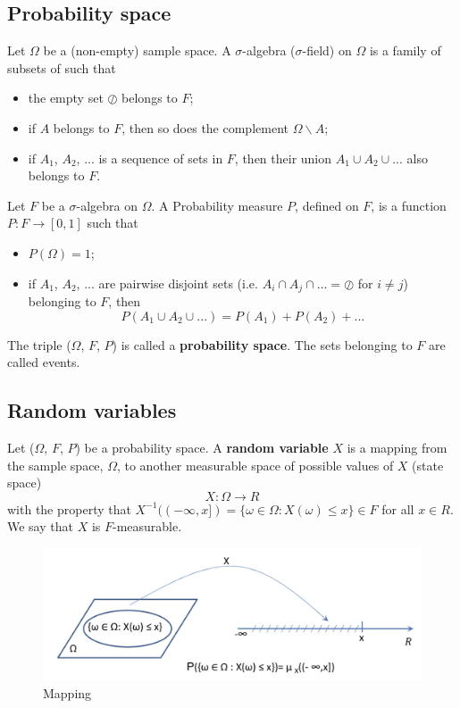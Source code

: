 \documentclass[11pt,a4paper]{book}
\theoremstyle{definition}\newtheorem{definition}{Definition}
\theoremstyle{definition}\newtheorem{fact}{Fact}
\theoremstyle{definition}\newtheorem{remark}{Remark}
\theoremstyle{definition}\newtheorem{ex}{Ex.}
\theoremstyle{definition}\newtheorem{project}{Project}
\theoremstyle{definition}\newtheorem{problem}{Problem}
\theoremstyle{definition}\newtheorem{example}{Example}
\numberwithin{theorem}{section}
\numberwithin{corollary}{chapter}
\numberwithin{assumption}{chapter}
\numberwithin{definition}{chapter}
\numberwithin{prop}{chapter}
\numberwithin{notation}{chapter}
\numberwithin{problem}{chapter}
\numberwithin{example}{chapter}
\numberwithin{fact}{chapter}
\numberwithin{ex}{chapter}
\begin{document}
\subsection{Probability space}
Let $\Omega$ be a (non-empty) sample space. A $\sigma$-algebra ($\sigma$-field) on $\Omega$ is a family of subsets of such that
\begin{itemize}
\item the empty set $\oslash$ belongs to $F$;
\item if $A$ belongs to $F$, then so does the complement $\Omega \backslash A$;
\item if $A_1$, $A_2$, ... is a sequence of sets in $F$, then their union $A_1 \cup A_2 \cup ...$ also belongs to $F$.
\end{itemize}

Let $F$ be a $\sigma$-algebra on $\Omega$. A Probability measure $P$, defined on $F$, is a function $P : F \rightarrow [0,1]$ such that
\begin{itemize}
\item $P(\Omega) = 1$;
\item if $A_1$, $A_2$, ... are pairwise disjoint sets (i.e. $A_i \cap A_j \cap ... = \oslash$ for $i \neq j$) belonging to $F$, then
$$P(A_1 \cup A_2 \cup ...)  = P(A_1) + P(A_2) + ...$$
\end{itemize}

The triple ($\Omega$, $F$, $P$) is called a \textbf{probability space}. The sets belonging to $F$ are called events.

\subsection{Random variables}
Let ($\Omega$, $F$, $P$) be a probability space. A \textbf{random variable} $X$ is a mapping from the sample space, $\Omega$, to another measurable space of possible values of $X$ (state space)
$$ X : \Omega \rightarrow R$$
with the property that $X^{-1}((-\infty, x]) = \{\omega \in \Omega : X(\omega) \leq x\} \in F$ for all $x \in R$. We say that $X$ is $F$-measurable.

\begin{figure}[H]
	\centering
	\includegraphics[scale=0.5]{Chapter01/Chapter1_1.png}
	\caption{Mapping}
\end{figure}
\end{document}
